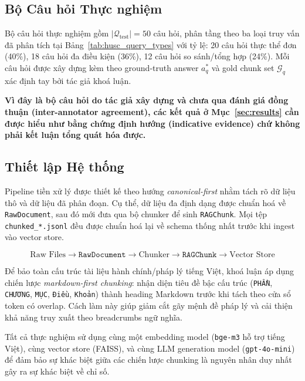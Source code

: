 \documentclass[12pt,a4paper]{report}
\theoremstyle{plain}
\theoremstyle{definition}
\begin{document}
	\subsection{Bộ Câu hỏi Thực nghiệm}
	\label{subsec:questions}
	
	Bộ câu hỏi thực nghiệm gồm $|\mathcal{Q}_{\text{test}}| = 50$ câu hỏi,
	phân tầng theo ba loại truy vấn đã phân tích tại Bảng~\ref{tab:husc_query_types}
	với tỷ lệ: 20 câu hỏi thực thể đơn (40\%), 18 câu hỏi đa điều kiện (36\%),
	12 câu hỏi so sánh/tổng hợp (24\%). Mỗi câu hỏi được xây dựng kèm theo
	ground-truth answer $a^*_q$ và gold chunk set $\mathcal{G}_q$ xác định
	tay bởi tác giả khoá luận.
	
	\textbf{Vì đây là bộ câu hỏi do tác giả xây dựng và chưa qua đánh giá
		đồng thuận (inter-annotator agreement), các kết quả ở Mục~\ref{sec:results}
		cần được hiểu như bằng chứng định hướng (indicative evidence) chứ không
		phải kết luận tổng quát hóa được.}
	
	\subsection{Thiết lập Hệ thống}
	\label{subsec:system_setup}
	
	Pipeline tiền xử lý được thiết kế theo hướng \emph{canonical-first} nhằm tách
	rõ dữ liệu thô và dữ liệu đã phân đoạn. Cụ thể, dữ liệu đa định dạng được
	chuẩn hoá về \texttt{RawDocument}, sau đó mới đưa qua bộ chunker để sinh
	\texttt{RAGChunk}. Mọi tệp \texttt{chunked\_*.jsonl} đều được chuẩn hoá lại về
	schema thống nhất trước khi ingest vào vector store.
	
	\begin{equation}
		\text{Raw Files} \rightarrow \texttt{RawDocument} \rightarrow \text{Chunker}
		\rightarrow \texttt{RAGChunk} \rightarrow \text{Vector Store}
		\label{eq:canonical_pipeline}
	\end{equation}
	
	Để bảo toàn cấu trúc tài liệu hành chính/pháp lý tiếng Việt, khoá luận áp dụng
	chiến lược \emph{markdown-first chunking}: nhận diện tiêu đề bậc cấu trúc
	(\texttt{PHẦN}, \texttt{CHƯƠNG}, \texttt{MỤC}, \texttt{Điều}, \texttt{Khoản})
	thành heading Markdown trước khi tách theo cửa sổ token có overlap. Cách làm
	này giúp giảm cắt gãy mệnh đề pháp lý và cải thiện khả năng truy xuất theo
	breadcrumbs ngữ nghĩa.
	
	Tất cả thực nghiệm sử dụng cùng một embedding model (\texttt{bge-m3}
	hỗ trợ tiếng Việt), cùng vector store (FAISS), và cùng LLM generation
	model (\texttt{gpt-4o-mini}) để đảm bảo sự khác biệt giữa các chiến lược
	chunking là nguyên nhân duy nhất gây ra sự khác biệt về chỉ số.
	
\end{document}
